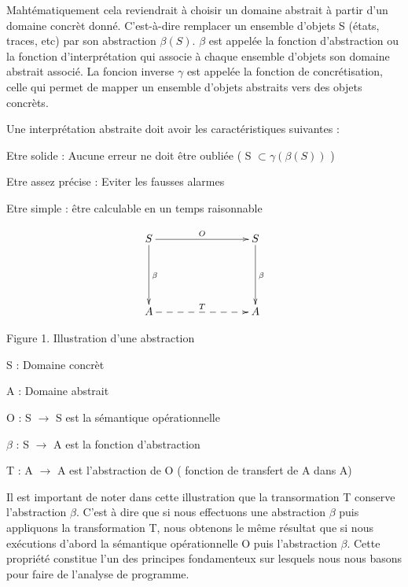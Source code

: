 \documentclass[french]{report}
\begin{document}
Mahtématiquement cela reviendrait à choisir un domaine abstrait à partir d'un domaine concrèt donné. C'est-à-dire remplacer un ensemble d'objets S (états, traces, etc) par son abstraction $\beta(S)$. $\beta$ est appelée la fonction d'abstraction ou la fonction d'interprétation qui associe à chaque ensemble d'objets son domaine abstrait associé. La foncion inverse $\gamma$ est appelée la fonction de concrétisation, celle qui permet de mapper un ensemble d'objets abstraits vers des objets concrèts.

Une interprétation abstraite doit avoir les caractéristiques suivantes :
\begin{description}
    \item Etre solide : Aucune erreur ne doit être oubliée ( S $\subset \gamma(\beta(S))$ )
    \item Etre assez précise : Eviter les fausses alarmes
    \item Etre simple : être calculable en un temps raisonnable
\end{description}

 \begin{equation*}
  \xymatrix@C+6em@R+3em{
   S \ar[r]^{O} \ar[d]^{\beta} & S \ar[d]^{\beta} \\
    A \ar@{-->}[r]^{T} & A
  }
 \end{equation*}

 \begin{center}Figure 1. Illustration d'une abstraction \end{center}

\begin{description}
	\item S : Domaine concrèt
    \item A : Domaine abstrait
    \item O : S $\rightarrow$ S est la sémantique opérationnelle
    \item $\beta$ : S $\rightarrow$ A est la fonction d'abstraction
    \item T : A $\rightarrow$ A est l'abstraction de O ( fonction de transfert de A dans A)
\end{description}

Il est important de noter dans cette illustration que la transormation T conserve l'abstraction $\beta$. C'est à dire que si nous effectuons une abstraction $\beta$ puis appliquons la transformation T, nous obtenons le même résultat que si nous exécutions d'abord la sémantique opérationnelle O puis l'abstraction $\beta$. Cette propriété constitue l'un des principes fondamenteux sur lesquels nous nous basons pour faire de l'analyse de programme.
\end{document}
